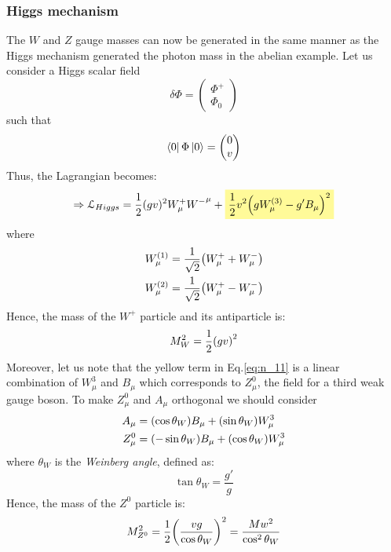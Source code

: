\documentclass[../../Main/Main.tex]{subfiles}
\begin{document}
\subsubsection{Higgs mechanism}
The \( W \)  and \( Z \)  gauge masses can now be generated in the same manner as the Higgs mechanism generated the photon mass in the abelian example.
Let us consider a Higgs scalar field
\begin{equation*}
  \delta \Phi = \begin{pmatrix}
  \Phi ^+ \\
  \Phi _0
  \end{pmatrix}
\end{equation*}
such that
\begin{equation*}
  \bra{0} \Phi \ket{0} = \begin{pmatrix}
  0 \\
  v
  \end{pmatrix}
\end{equation*}
Thus, the Lagrangian becomes:
\begin{equation}
  \Rightarrow \mathcal{L}_{Higgs} = \frac{1}{2} (g v )^2 W_ \mu ^+ {W^-}^\mu
  + \mathcolorbox{yellow!40}{\frac{1}{2} v^2 \qty(g W _ \mu ^{(3)} - g' B _ \mu )^2}
  \label{eq:n_11}
\end{equation}
where
\begin{subequations}
\begin{align*}
  W_ \mu ^{(1)} &=  \frac{1}{\sqrt{2} } \qty(W_ \mu ^+ + W _ \mu ^-) \\
  W_ \mu ^{(2)} &=  \frac{1}{\sqrt{2} } \qty(W_ \mu ^+ - W _ \mu ^-)
\end{align*}
\end{subequations}
Hence, the mass of the \( W^+ \) particle and its antiparticle is:
\begin{equation*}
  M_W^2 = \frac{1}{2} \qty(g v)^2
\end{equation*}
Moreover, let us note that the yellow term in Eq.\eqref{eq:n_11} is a linear combination of \( W_ \mu ^3 \) and \( B_ \mu  \) which corresponds to \( Z^0_\mu \), the field for a third weak gauge boson.
To make \( Z_ \mu ^0 \) and \( A _ \mu  \) orthogonal we should consider
\begin{subequations}
\begin{align*}
  A_ \mu  &=  \qty(\cos \theta _W) B _ \mu  + \qty(\sin \theta _W ) W_ \mu ^3 \\
  Z_ \mu ^0 & = \qty(- \sin \theta _W ) B _ \mu + \qty(\cos \theta _W ) W_ \mu ^3
\end{align*}
\end{subequations}
where \( \theta _W \) is the \emph{Weinberg angle}, defined as:
\begin{equation*}
  \tan \theta _W = \frac{g'}{g}
\end{equation*}
Hence, the mass of the \( Z^0 \) particle is:
\begin{equation*}
  M_ {Z^0}^2 = \frac{1}{2} \qty(\frac{vg}{\cos \theta _W})^2 = \frac{M w^2}{\cos^2 \theta _W}
\end{equation*}
\end{document}
